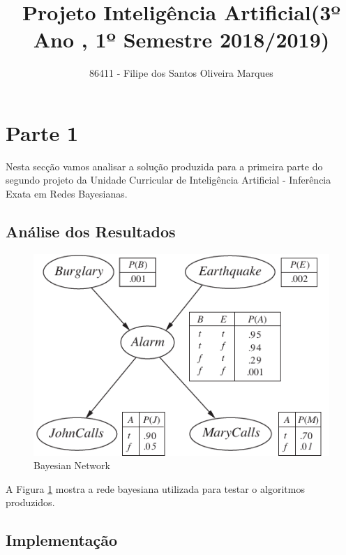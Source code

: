 \documentclass[11pt, a4paper, twocolumn]{article}
\author{86411 - Filipe dos Santos Oliveira Marques}
\title{Projeto Inteligência Artificial(3º Ano , 1º Semestre 2018/2019)}
\begin{document}
\maketitle
\section{Parte 1}
\hspace{10mm}Nesta secção vamos analisar a solução produzida para a primeira parte do segundo projeto da Unidade Curricular de Inteligência Artificial - Inferência Exata em Redes Bayesianas.
\subsection{Análise dos Resultados}
\begin{figure}[h!]
	\includegraphics[scale=.45]{images/bn-b.png}
	\caption{Bayesian Network}
	\label{fig:bn1}
\end{figure}
A Figura \ref{fig:bn1} mostra a rede bayesiana utilizada para testar o algoritmos produzidos. %
\subsection{Implementação}
\end{document}
